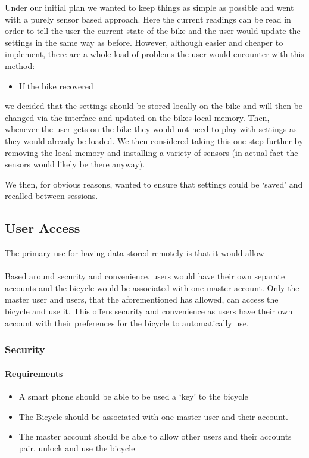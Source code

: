 \documentclass[a4paper]{report}
\begin{document}
Under our initial plan we wanted to keep things as simple as possible and went with a purely sensor based approach. Here the current readings can be read in order to tell the user the current state of the bike and the user would update the settings in the same way as before. However, although easier and cheaper to implement, there are a whole load of problems the user would encounter with this method: 
\begin{itemize}
  \item If the bike recovered 
\end{itemize}
we decided that the settings should be stored locally on the bike and will then be changed via the interface and updated on the bikes local memory. Then, whenever the user gets on the bike they would not need to play with settings as they would already be loaded. We then considered taking this one step further by removing the local memory and installing a variety of sensors (in actual fact the sensors would likely be there anyway).

We then, for obvious reasons, wanted to ensure that settings could be `saved' and recalled between sessions. 


\subsection{User Access}
The primary use for having data stored remotely is that it would allow 

\paragraph{} Based around security and convenience, users would have their own separate accounts and the bicycle would be associated with one master account. Only the master user and users, that the aforementioned has allowed, can access the bicycle and use it. This offers security and convenience as users have their own account with their preferences for the bicycle to automatically use. 

\subsubsection{\textbf{Security}}

\paragraph{Requirements}

\begin{itemize}
\item A smart phone should be able to be used a `key' to the bicycle
\item The Bicycle should be associated with one master user and their account.
\item The master account should be able to allow other users and their accounts pair, unlock and use the bicycle

\end{itemize}
\end{document}
